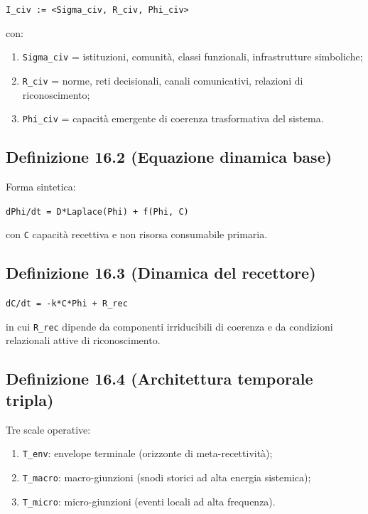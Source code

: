 \texttt{I\_civ\ :=\ \textless{}Sigma\_civ,\ R\_civ,\ Phi\_civ\textgreater{}}

con:

\begin{enumerate}
\def\labelenumi{\arabic{enumi}.}
\tightlist
\item
  \texttt{Sigma\_civ} = istituzioni, comunità, classi funzionali, infrastrutture simboliche;
\item
  \texttt{R\_civ} = norme, reti decisionali, canali comunicativi, relazioni di riconoscimento;
\item
  \texttt{Phi\_civ} = capacità emergente di coerenza trasformativa del sistema.
\end{enumerate}

\subsection{Definizione 16.2 (Equazione dinamica base)}

Forma sintetica:

\texttt{dPhi/dt\ =\ D*Laplace(Phi)\ +\ f(Phi,\ C)}

con \texttt{C} capacità recettiva e non risorsa consumabile primaria.

\subsection{Definizione 16.3 (Dinamica del recettore)}

\texttt{dC/dt\ =\ -k*C*\textbar{}Phi\textbar{}\ +\ R\_rec}

in cui \texttt{R\_rec} dipende da componenti irriducibili di coerenza e da condizioni relazionali attive di riconoscimento.

\subsection{Definizione 16.4 (Architettura temporale tripla)}

Tre scale operative:

\begin{enumerate}
\def\labelenumi{\arabic{enumi}.}
\tightlist
\item
  \texttt{T\_env}: envelope terminale (orizzonte di meta-recettività);
\item
  \texttt{T\_macro}: macro-giunzioni (snodi storici ad alta energia sistemica);
\item
  \texttt{T\_micro}: micro-giunzioni (eventi locali ad alta frequenza).
\end{enumerate}

